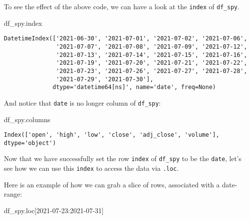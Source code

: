 \documentclass[
  letterpaper,
  DIV=11,
  numbers=noendperiod]{scrreprt}
\newenvironment{Shaded}{\begin{snugshade}}{\end{snugshade}}
\newcommand{\NormalTok}[1]{\textcolor[rgb]{0.00,0.23,0.31}{#1}}
\newcommand{\StringTok}[1]{\textcolor[rgb]{0.13,0.47,0.30}{#1}}
\begin{document}
To see the effect of the above code, we can have a look at the
\texttt{index} of \texttt{df\_spy}.

\begin{Shaded}
\begin{Highlighting}[]
\NormalTok{df\_spy.index}
\end{Highlighting}
\end{Shaded}

\begin{verbatim}
DatetimeIndex(['2021-06-30', '2021-07-01', '2021-07-02', '2021-07-06',
               '2021-07-07', '2021-07-08', '2021-07-09', '2021-07-12',
               '2021-07-13', '2021-07-14', '2021-07-15', '2021-07-16',
               '2021-07-19', '2021-07-20', '2021-07-21', '2021-07-22',
               '2021-07-23', '2021-07-26', '2021-07-27', '2021-07-28',
               '2021-07-29', '2021-07-30'],
              dtype='datetime64[ns]', name='date', freq=None)
\end{verbatim}

And notice that \texttt{date} is no longer column of \texttt{df\_spy}:

\begin{Shaded}
\begin{Highlighting}[]
\NormalTok{df\_spy.columns}
\end{Highlighting}
\end{Shaded}

\begin{verbatim}
Index(['open', 'high', 'low', 'close', 'adj_close', 'volume'], dtype='object')
\end{verbatim}

Now that we have successfully set the row \texttt{index} of
\texttt{df\_spy} to be the \texttt{date}, let's see how we can use this
\texttt{index} to access the data via \texttt{.loc}.

Here is an example of how we can grab a slice of rows, associated with a
date-range:

\begin{Shaded}
\begin{Highlighting}[]
\NormalTok{df\_spy.loc[}\StringTok{\textquotesingle{}2021{-}07{-}23\textquotesingle{}}\NormalTok{:}\StringTok{\textquotesingle{}2021{-}07{-}31\textquotesingle{}}\NormalTok{]}
\end{Highlighting}
\end{Shaded}
\end{document}
